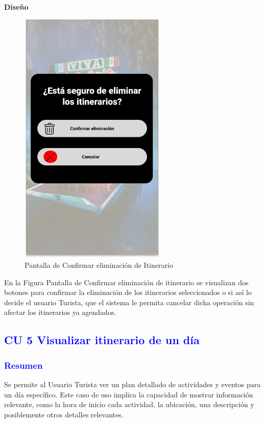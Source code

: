 \textbf{Diseño}
\begin{figure}[h]
        \centering
        \includegraphics[width= 7cm]{Pantallas Prototipo3/IU31 Pantalla Eliminar Itinerario.jpg}
        \caption{Pantalla de Confirmar eliminación de Itinerario}
        \label{fig:enter-label}
    \end{figure}
 

En la Figura Pantalla de Confirmar eliminación de itinerario se visualizan dos botones para confirmar la eliminación de los itinerarios seleccionados o si así lo decide el usuario Turista, que el sistema le permita cancelar dicha operación sin afectar los itinerarios ya agendados. 


\newpage


\subsection{\textcolor{blue}{CU 5 Visualizar itinerario de un día}}
\subsubsection{\textcolor{blue}{Resumen}}
Se permite al Usuario Turista ver un plan detallado de actividades y eventos para un día específico. Este caso de uso implica la capacidad de mostrar información relevante, como la hora de inicio cada actividad, la ubicación, una descripción y posiblemente otros detalles relevantes.

